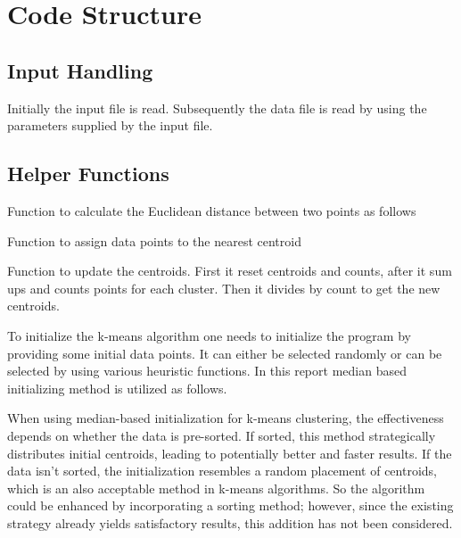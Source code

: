 \newpage
\section{Code Structure}

\subsection{Input Handling}

Initially the input file is read. Subsequently the data file is read by using the parameters supplied by the input file. 


\subsection{Helper Functions}

Function to calculate the Euclidean distance between two points as follows


Function to assign data points to the nearest centroid


Function to update the centroids. First it reset centroids and counts, after it sum ups and counts points for each cluster. Then it divides by count to get the new centroids. 


To initialize the k-means algorithm one needs to initialize the program by providing some initial data points. It can either be selected randomly or can be selected by using various heuristic functions. In this report median based initializing method is utilized as follows.

When using median-based initialization for k-means clustering, the effectiveness depends on whether the data is pre-sorted. If sorted, this method strategically distributes initial centroids, leading to potentially better and faster results. If the data isn't sorted, the initialization resembles a random placement of centroids, which is an also acceptable method in k-means algorithms. So the algorithm could be enhanced by incorporating a sorting method; however, since the existing strategy already yields satisfactory results, this addition has not been considered.



